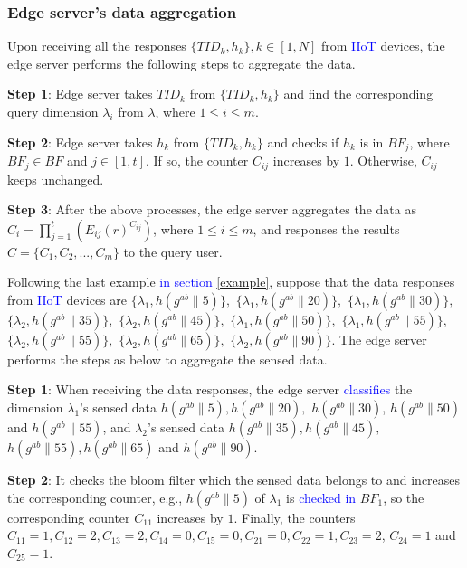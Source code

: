 \documentclass[IEEE JOURNAL OF BIOMEDICAL AND HEALTH INFORMATICS]{IEEEtran}
\begin{document}
{\subsubsection{Edge server's data aggregation}
Upon receiving all the responses $\{TID_k, h_k\}, k\in [1, N]$ from \textcolor{blue}{IIoT} devices, the edge server performs the following steps to aggregate the data.

\textbf{Step 1}: Edge server takes $TID_k$ from $\{TID_k, h_k\}$ and find the corresponding query dimension $\lambda_i$ from $\lambda$, where $1\le i \le m$.

\textbf{Step 2}: Edge server takes $h_k$ from $\{TID_k, h_k\}$ and checks if $h_k$ is in $BF_j$, where $BF_j \in BF$ and $j \in [1, t]$. If so, the counter $C_{ij}$ increases by $1$. Otherwise, $C_{ij}$ keeps unchanged.

\textbf{Step 3}: After the above processes, the edge server aggregates the data as $C_i = \prod_{j=1}^{t}(E_{ij}(r)^{C_{ij}})$, where $1\le i \le m$, and responses the results $C=\{C_1, C_2, ... ,C_m\}$ to the query user.


  Following the last example \textcolor{blue}{in section \ref{example}}, suppose that the data responses from \textcolor{blue}{IIoT} devices are 
 \label{example2} $\{\lambda_1,h(g^{ab}\|5)\},$ $ \{\lambda_1, h(g^{ab}\|20)\},$ $ \{\lambda_1, h(g^{ab}\|30)\},$ $ \{\lambda_2, h(g^{ab}\|35)\},$ $ \{\lambda_2, h(g^{ab}\|45)\}, $ $ \{\lambda_1, h(g^{ab}\|50)\}, $ $ \{\lambda_1, h(g^{ab}\|55)\},$ $ \{\lambda_2, h(g^{ab}\|55)\}, $ $ \{\lambda_2, h(g^{ab}\|65)\}, $ $ \{\lambda_2, h(g^{ab}\|90)\}$. The edge server performs the steps as below to aggregate the sensed data.

  \textbf{Step 1}: When receiving the data responses, the edge server \textcolor{blue}{classifies} the dimension $\lambda_1$'s sensed data $h(g^{ab}\|5), h(g^{ab}\|20),$ $ h(g^{ab}\|30)$, $h(g^{ab}\|50)$ and $h(g^{ab}\|55)$, and $\lambda_2$'s sensed data $h(g^{ab}\|35), h(g^{ab}\|45),$ $ h(g^{ab}\|55), h(g^{ab}\|65)$ and $h(g^{ab}\|90)$.

  \textbf{Step 2}: It checks the bloom filter which the sensed data belongs to and increases the corresponding counter, e.g., $h(g^{ab}\|5)$ of $\lambda_1$ is \textcolor{blue}{checked in} $BF_1$, so the corresponding counter $C_{11}$ increases by $1$. Finally, the counters $C_{11}=1, C_{12}=2, C_{13}=2,C_{14}=0, C_{15}=0, C_{21}=0, C_{22}=1, C_{23}=2$, $C_{24}=1$ and $C_{25}=1$.

}
\end{document}
